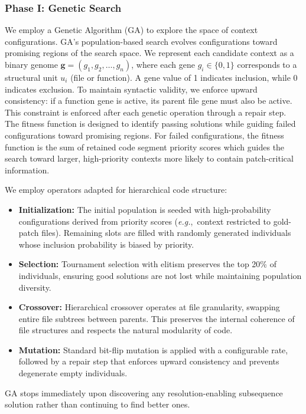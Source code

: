 \documentclass[sigconf,nonacm]{acmart}
\newcommand{\eg}{\textit{e.g.},~}
\begin{document}
\subsubsection{Phase I: Genetic Search}
We employ a Genetic Algorithm (GA) to explore the space of context configurations. GA's population-based search evolves configurations toward promising regions of the search space. We represent each candidate context as a binary genome $\mathbf{g} = (g_1, g_2, \ldots, g_n)$, where each gene $g_i \in \{0, 1\}$ corresponds to a structural unit $u_i$ (file or function). A gene value of 1 indicates inclusion, while 0 indicates exclusion. To maintain syntactic validity, we enforce upward consistency: if a function gene is active, its parent file gene must also be active. This constraint is enforced after each genetic operation through a repair step. The fitness function is designed to identify passing solutions while guiding failed configurations toward promising regions. For failed configurations, the fitness function is the sum of retained code segment priority scores which guides the search toward larger, high-priority contexts more likely to contain patch-critical information.

We employ operators adapted for hierarchical code structure:
\begin{itemize}
    \item \textbf{Initialization:} The initial population is seeded with high-probability configurations derived from priority scores (\eg context restricted to gold-patch files). Remaining slots are filled with randomly generated individuals whose inclusion probability is biased by priority.
    \item \textbf{Selection:} Tournament selection with elitism preserves the top 20\% of individuals, ensuring good solutions are not lost while maintaining population diversity.
    \item \textbf{Crossover:} Hierarchical crossover operates at file granularity, swapping entire file subtrees between parents. This preserves the internal coherence of file structures and respects the natural modularity of code.
    \item \textbf{Mutation:} Standard bit-flip mutation is applied with a configurable rate, followed by a repair step that enforces upward consistency and prevents degenerate empty individuals.
\end{itemize}

GA stops immediately upon discovering any resolution-enabling subsequence solution rather than continuing to find better ones.
\end{document}
